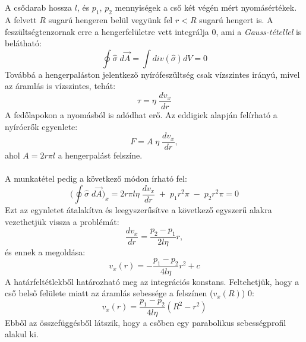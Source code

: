 \documentclass[a4paper, titlepage]{article}
\begin{document}
\\\\
A csődarab hossza $l$, és $p_1$, $p_2$ mennyiségek a cső két végén mért nyomásértékek. A felvett $R$ sugarú hengeren belül vegyünk fel $r<R$ sugarú hengert is. A feszültségtenzornak erre a hengerfelületre vett integrálja 0, ami  a \textit{Gauss-tétellel} is belátható:
$$
\oint\hat{\sigma}\;d\vec{A}=\int div(\hat{\sigma})dV=0
$$
Továbbá a hengerpaláston jelentkező nyírófeszültség csak vízszintes irányú, mivel az áramlás is vízszintes, tehát:
$$
\tau=\eta\;\frac{dv_x}{dr}
$$
A fedőlapokon a nyomásból is adódhat erő.
Az eddigiek alapján felírható a nyíróerők egyenlete:
\begin{equation}
F=A\;\eta\;\frac{dv_x}{dr},
\end{equation}
ahol $A=2r\pi l$ a hengerpalást felszíne.\\\\
A munkatétel pedig a következő módon írható fel:
\begin{equation}
\bigg(\oint\hat{\sigma}\;d\vec{A}\bigg)_x=2r\pi l\eta\;\frac{dv_x}{dr}\;+\;p_1r^2\pi\;-\;p_2r^2\pi=0
\end{equation}
Ezt az egynletet átalakítva és leegyszerűsítve a következő egyszerű alakra vezethetjük vissza a problémát:$$
\frac{dv_x}{dr}=\frac{p_2-p_1}{2l\eta}r,
$$
és ennek a megoldása:
\begin{equation}
v_x(r)=-\frac{p_1-p_2}{4l\eta}r^2+c
\end{equation}
A határfeltétlekből határozható meg az integrációs konstans. Feltehetjük, hogy a cső belső felülete miatt az áramlás sebessége a felszínen ($v_x(R)$) 0:
\begin{equation}
v_x(r)=\frac{p_1-p_2}{4l\eta}(R^2-r^2)
\end{equation}
Ebből az összefüggésből látszik, hogy a csőben egy parabolikus sebességprofil alakul ki.
\end{document}

